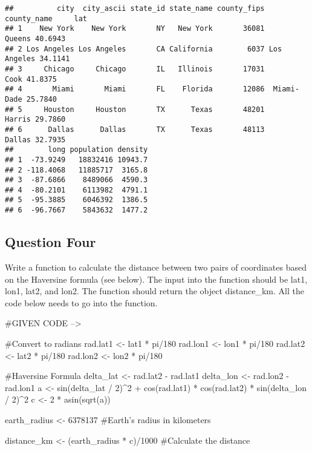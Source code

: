\documentclass[
  12pt,
]{article}
\begin{document}
\begin{verbatim}
##          city  city_ascii state_id state_name county_fips county_name     lat
## 1    New York    New York       NY   New York       36081      Queens 40.6943
## 2 Los Angeles Los Angeles       CA California        6037 Los Angeles 34.1141
## 3     Chicago     Chicago       IL   Illinois       17031        Cook 41.8375
## 4       Miami       Miami       FL    Florida       12086  Miami-Dade 25.7840
## 5     Houston     Houston       TX      Texas       48201      Harris 29.7860
## 6      Dallas      Dallas       TX      Texas       48113      Dallas 32.7935
##        long population density
## 1  -73.9249   18832416 10943.7
## 2 -118.4068   11885717  3165.8
## 3  -87.6866    8489066  4590.3
## 4  -80.2101    6113982  4791.1
## 5  -95.3885    6046392  1386.5
## 6  -96.7667    5843632  1477.2
\end{verbatim}

\subsection{Question Four}\label{question-four}

Write a function to calculate the distance between two pairs of
coordinates based on the Haversine formula (see below). The input into
the function should be lat1, lon1, lat2, and lon2. The function should
return the object distance\_km. All the code below needs to go into the
function.

\#GIVEN CODE --\textgreater{}

\#Convert to radians rad.lat1 \textless- lat1 * pi/180 rad.lon1
\textless- lon1 * pi/180 rad.lat2 \textless- lat2 * pi/180 rad.lon2
\textless- lon2 * pi/180

\#Haversine Formula delta\_lat \textless- rad.lat2 - rad.lat1 delta\_lon
\textless- rad.lon2 - rad.lon1 a \textless- sin(delta\_lat / 2)\^{}2 +
cos(rad.lat1) * cos(rad.lat2) * sin(delta\_lon / 2)\^{}2 c \textless- 2
* asin(sqrt(a))

earth\_radius \textless- 6378137 \#Earth's radius in kilometers

distance\_km \textless- (earth\_radius * c)/1000 \#Calculate the
distance
\end{document}
